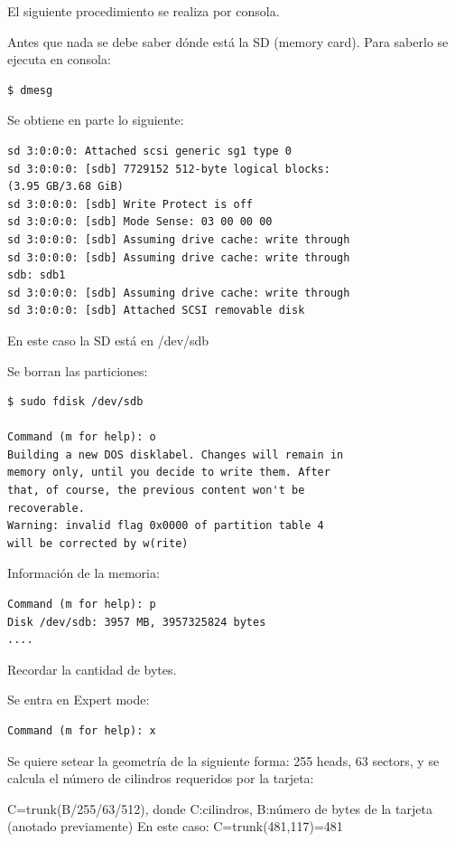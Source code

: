 
El siguiente procedimiento se realiza por consola.

\bigskip
Antes que nada se debe saber dónde está la SD (memory card).
Para saberlo se ejecuta en consola: 

\begin{verbatim}
$ dmesg
\end{verbatim}

Se obtiene en parte lo siguiente: 
\begin{verbatim}
sd 3:0:0:0: Attached scsi generic sg1 type 0 
sd 3:0:0:0: [sdb] 7729152 512-byte logical blocks: 
(3.95 GB/3.68 GiB) 
sd 3:0:0:0: [sdb] Write Protect is off 
sd 3:0:0:0: [sdb] Mode Sense: 03 00 00 00 
sd 3:0:0:0: [sdb] Assuming drive cache: write through 
sd 3:0:0:0: [sdb] Assuming drive cache: write through 
sdb: sdb1 
sd 3:0:0:0: [sdb] Assuming drive cache: write through 
sd 3:0:0:0: [sdb] Attached SCSI removable disk 
\end{verbatim}

En este caso la SD está en /dev/sdb 

\bigskip
Se borran las particiones: 

\begin{verbatim}
$ sudo fdisk /dev/sdb

Command (m for help): o 
Building a new DOS disklabel. Changes will remain in 
memory only, until you decide to write them. After 
that, of course, the previous content won't be 
recoverable. 
Warning: invalid flag 0x0000 of partition table 4 
will be corrected by w(rite) 
\end{verbatim}

Información de la memoria: 

\begin{verbatim}
Command (m for help): p 
Disk /dev/sdb: 3957 MB, 3957325824 bytes 
.... 
\end{verbatim}

Recordar la cantidad de bytes.

\bigskip
Se entra en Expert mode: 

\bigskip
\begin{verbatim}
Command (m for help): x 
\end{verbatim}

Se quiere setear la geometría de la siguiente forma: 255 heads, 63 sectors, y se calcula el 
número de cilindros requeridos por la tarjeta: 

\bigskip
C=trunk(B/255/63/512), donde C:cilindros, B:número de bytes de la tarjeta (anotado previamente) 
En este caso: C=trunk(481,117)=481 

